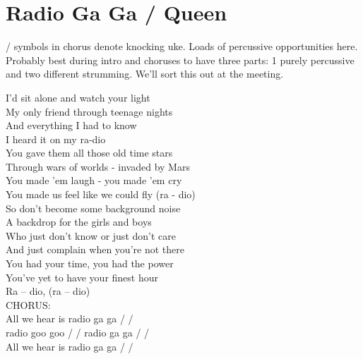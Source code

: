 \section{Radio Ga Ga / Queen}\label{sec:radio_ga_ga}
  {\small / symbols in chorus denote knocking uke. Loads of percussive opportunities here. Probably best during intro and choruses to have three parts: 1 purely percussive and two different strumming. We’ll sort this out at the meeting.}
  
  \Fmajor
  \BflatMajor
  \Gminor
  \Cmajor
  
       
          
  I'd sit alone and watch your light\\
  My only friend through teenage nights\\
  And everything I had to know\\
  I heard it on my ra-dio\\
  You gave them all those old time stars\\
  Through wars of worlds - invaded by Mars\\
  You made 'em laugh - you made 'em cry\\
  You made us feel like we could fly (ra - dio)\\
  So don't become some background noise\\
  A backdrop for the girls and boys\\
  Who just don't know or just don't care\\
  And just complain when you're not there\\
  You had your time, you had the power\\
  You've yet to have your finest hour\\
  Ra – dio, (ra – dio)\\
  CHORUS:\\
  All we hear is radio ga ga / /\\
  radio goo goo / / radio ga ga / /\\
  All we hear is radio ga ga / /\\
